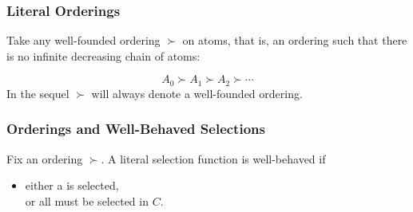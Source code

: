 \begin{frame}
  \frametitle{Literal Orderings}

  Take any \alert{well-founded ordering} $\succ$ on atoms, that is, an
  ordering such that there is no infinite decreasing chain of atoms:

  \[
  A_0 \succ A_1 \succ A_2 \succ \cdots
  \]
In the sequel $\succ$ will always denote a well-founded ordering.

\medskip



\medskip


\end{frame}



\begin{frame}
  \frametitle{Orderings and Well-Behaved Selections}

Fix an ordering $\succ$. A literal selection function is
\alert{well-behaved} if 

\begin{itemize}
\item either a
   is selected, 
  \\
  or all
 must be selected in $C$.
\end{itemize}

\medskip



                                \end{frame}



